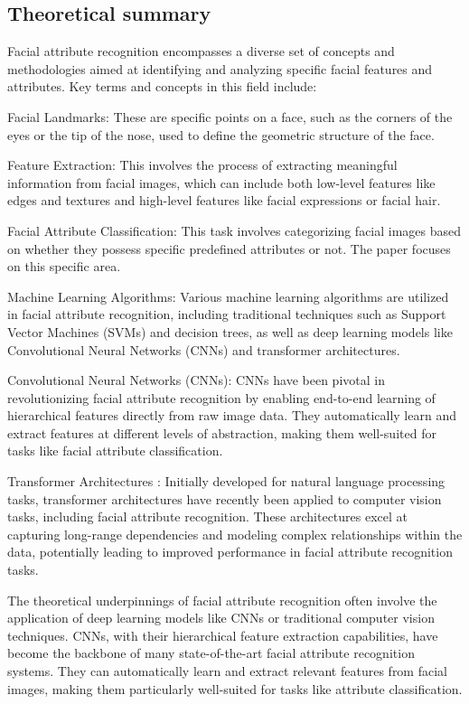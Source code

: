 \documentclass[a4paper,oneside]{article}
\begin{document}
\subsection{Theoretical summary}
\label{sec:theoretical_summary}

Facial attribute recognition encompasses a diverse set of concepts and methodologies aimed at identifying and analyzing specific facial features and attributes. Key terms and concepts in this field include:

Facial Landmarks: These are specific points on a face, such as the corners of the eyes or the tip of the nose, used to define the geometric structure of the face.

Feature Extraction: This involves the process of extracting meaningful information from facial images, which can include both low-level features like edges and textures and high-level features like facial expressions or facial hair.

Facial Attribute Classification: This task involves categorizing facial images based on whether they possess specific predefined attributes or not. The paper focuses on this specific area.

Machine Learning Algorithms: Various machine learning algorithms are utilized in facial attribute recognition, including traditional techniques such as Support Vector Machines (SVMs) and decision trees, as well as deep learning models like Convolutional Neural Networks (CNNs) and transformer architectures.

Convolutional Neural Networks \citet{DBLP:journals/corr/OSheaN15} (CNNs): CNNs have been pivotal in revolutionizing facial attribute recognition by enabling end-to-end learning of hierarchical features directly from raw image data. They automatically learn and extract features at different levels of abstraction, making them well-suited for tasks like facial attribute classification.

Transformer Architectures \citet{DBLP:journals/corr/VaswaniSPUJGKP17}: Initially developed for natural language processing tasks, transformer architectures have recently been applied to computer vision tasks, including facial attribute recognition. These architectures excel at capturing long-range dependencies and modeling complex relationships within the data, potentially leading to improved performance in facial attribute recognition tasks.

The theoretical underpinnings of facial attribute recognition often involve the application of deep learning models like CNNs or traditional computer vision techniques. CNNs, with their hierarchical feature extraction capabilities, have become the backbone of many state-of-the-art facial attribute recognition systems. They can automatically learn and extract relevant features from facial images, making them particularly well-suited for tasks like attribute classification.
\end{document}
